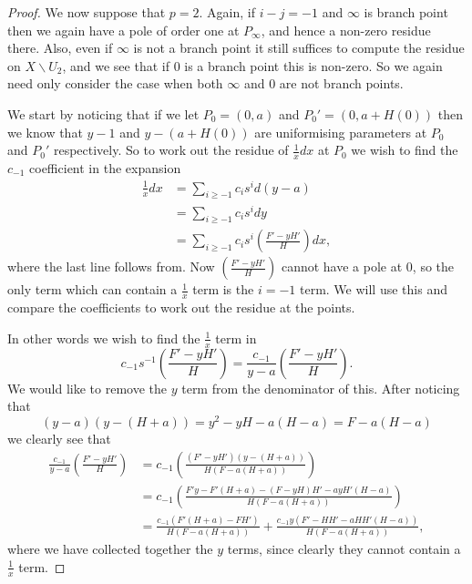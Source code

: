 \documentclass[draft, 11pt]{article} %
\theoremstyle{plain}
\theoremstyle{remark}
\begin{document}
\begin{proof}

We now suppose that $p=2$.
Again, if $i-j=-1$ and $\infty$ is branch point then we again have a pole of order one at $P_\infty$, and hence a non-zero residue there.
Also, even if $\infty$ is not a branch point it still suffices to compute the residue on $X\backslash U_2$, and we see that if $0$ is a branch point this is non-zero.
So we again need only consider the case when both $\infty$ and $0$ are not branch points.

We start by noticing that if we let $P_0 = (0,a)$ and $P_0' = (0,a+H(0))$ then we know that $y-1$ and $y-(a+H(0))$ are uniformising parameters at $P_0$ and $P_0'$ respectively.
So to work out the residue of $\frac{1}{x}dx$ at $P_0$ we wish to find the $c_{-1}$ coefficient in the expansion
\begin{align*}
\frac{1}{x}dx & = \sum_{i \geq -1} c_i s^i d(y-a) \\
& = \sum_{i\geq -1} c_i s^i dy \\
& = \sum_{i \geq -1} c_i s^i \left(\frac{F' - yH'}{H} \right) dx,
\end{align*}
where the last line follows from. 
Now $\left(\frac{F' -yH'}{H}\right)$ cannot have a pole at $0$, so the only term which can contain a $\frac{1}{x}$ term is the $i=-1$ term.
We will use this and compare the coefficients to work out the residue at the points. 

In other words we wish to find the $\frac{1}{x}$ term in 
\[
c_{-1}s^{-1}\left(\frac{F' - yH'}{H} \right) = \frac{c_{-1}}{y-a} \left( \frac{F' - yH'}{H} \right).
\]
We would like to remove the $y$ term from the denominator of this.
After noticing that 
\[
(y-a)(y-(H+a)) = y^2 - yH - a(H-a) = F- a(H-a)
\]
we clearly see that 
\begin{align*}
\frac{c_{-1}}{y-a} \left( \frac{F' - yH'}{H} \right) & = c_{-1} \left( \frac{(F'-yH')(y-(H+a))}{H(F-a(H+a))} \right) \\
& = c_{-1} \left( \frac{F'y - F'(H+a) - (F -yH)H' - ayH'(H-a)}{H(F-a(H+a))} \right) \\
& = \frac{c_{-1}(F'(H+a) - FH')}{H(F-a(H+a))} + \frac{c_{-1}y(F' - HH' - aHH'(H-a))}{H(F-a(H+a))},
\end{align*}
where we have collected together the $y$ terms, since clearly they cannot contain a $\frac{1}{x}$ term.


\end{proof}
\end{document}
